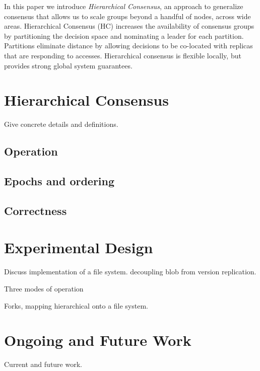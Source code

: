 \documentclass[11pt,letterpaper]{article}
\begin{document}
In this paper we introduce \textit{Hierarchical Consensus}, an approach to generalize
consensus that allows us to scale groups beyond a handful of nodes, across wide areas.
Hierarchical Consensus (HC) increases the availability of consensus groups by
partitioning the decision space and nominating a leader for each partition.
Partitions eliminate distance by allowing decisions to be co-located with replicas that
are responding to accesses. Hierarchical consensus is flexible locally, but provides
strong global system guarantees.

\section{Hierarchical Consensus}

Give concrete details and definitions.

\subsection{Operation}

\subsection{Epochs and ordering}

\subsection{Correctness}

\section{Experimental Design}

Discuss implementation of a file system. decoupling blob from version replication.

Three modes of operation

Forks, mapping hierarchical onto a file system.

\section{Ongoing and Future Work}

Current and future work.



\end{document}
